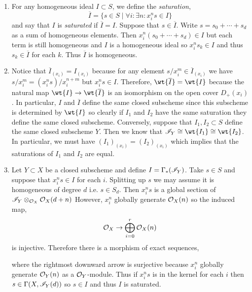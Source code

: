 \documentclass[12pt]{article}
\begin{document}
\begin{enumerate}
\item For any homogeneous ideal $I \subset S$, we define the \textit{saturation},
\[ \overline{I} = \{ s \in S \mid \forall i : \exists n : x^n_i s \in I \} \]
and say that $I$ is \textit{saturated} if $\overline{I} = I$. Suppose that $s \in \overline{I}$. Write $s = s_0 + \cdots + s_d$ as a sum of homogeneous elements. Then $x_i^n(s_0 + \cdots + s_d) \in I$ but each term is still homogeneous and $I$ is a homogeneous ideal so $x_i^n s_k \in I$ and thus $s_k \in \overline{I}$ for each $k$. Thus $\overline{I}$ is homogeneous.

\item Notice that $\overline{I}_{(x_i)} = I_{(x_i)}$ because for any element $s/x_i^m \in \overline{I}_{(x_i)}$ we have $s/x_i^m = (x^n_i s)/x_i^{n+m}$ but $x^n_i s \in I$. Therefore, $\wt{\overline{I}} = \wt{I}$ because the natural map $\wt{I} \to \wt{\overline{I}}$ is an isomorphism on the open cover $D_{+}(x_i)$. In particular, $I$ and $\overline{I}$ define the same closed subscheme since this subscheme is determined by $\wt{I}$ so clearly if $I_1$ and $I_2$ have the same saturation they define the same closed subscheme. Conversely, suppose that $I_1, I_2 \subset S$ define the same closed subscheme $Y$. Then we know that $\I_Y \cong \wt{I_1} \cong \wt{I_2}$. In particular, we must have $(I_1)_{(x_i)} = (I_2)_{(x_i)}$ which implies that the saturations of $I_1$ and $I_2$ are equal.

\item Let $Y \subset X$ be a closed subscheme and define $I = \Gamma_*(\mathscr{I}_Y)$. Take $s \in S$ and suppose that $x_i^n s \in I$ for each $i$. Splitting up $s$ we may assume it is homogeneous of degree $d$ i.e. $s \in S_d$. Then $x_i^n s$ is a global section of $\mathscr{I}_Y \otimes_{\mathcal{O}_{X}} \mathcal{O}_{X}(d+n)$ 
However, $x_i^n$ globally generate $\mathcal{O}_{X}(n)$ so the induced map,
\[ \mathcal{O}_{X} \to \bigoplus_{i = 0}^r \mathcal{O}_{X}(n) \]
is injective. Therefore there is a morphism of exact sequences,
\begin{center}
\end{center}
where the rightmost downward arrow is surjective because $x_i^n$ globally generate $\mathcal{O}_{Y}(n)$ as a $\mathcal{O}_{Y}$-module.  Thus if $x^n_i s$ is in the kernel for each $i$ then $s \in \Gamma(X, \mathscr{I}_Y(d))$ so $s \in I$ and thus $I$ is saturated.


\end{enumerate}
\end{document}
